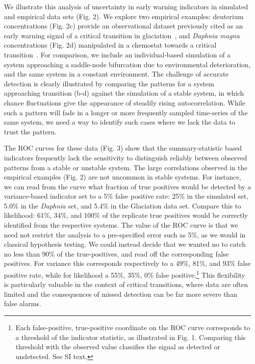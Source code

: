 \documentclass{pnastwo}
\begin{document}
\begin{article}
We illustrate this analysis of uncertainty in early warning indicators in simulated and empirical data sets (Fig. 2). 
We explore two empirical examples:
deuterium concentrations (Fig. 2c) provide an observational dataset previously cited as an early warning signal of a critical transition in glaciation~\cite{Dakos2008},
and \emph{Daphnia magna} concentrations (Fig. 2d) manipulated in a chemostat towards a critical transition~\cite{Drake2010}.  
For comparison, we include an individual-based simulation of a system approaching a saddle-node bifurcation due to environmental deterioration,
and the same system in a constant environment. 
The challenge of accurate detection is clearly illustrated by comparing the patterns for a system approaching transition (b-d) 
against the simulation of a stable system, in which chance fluctuations give the appearance of steadily rising autocorrelation. 
While such a pattern will fade in a longer or more frequently sampled time-series of the same system, 
we need a way to identify such cases where we lack the data to trust the pattern.  

The ROC curves for these data (Fig. 3) show that the summary-statistic based indicators 
frequently lack the sensitivity to distinguish reliably between observed patterns from a stable or unstable system. 
The large correlations observed in the empirical examples (Fig. 2) are not uncommon in stable systems. 
For instance, we can read from the curve what fraction of true positives would be detected by a variance-based indicator
set to a 5\% false positive rate:
25\% in the simulated set,
5.0\% in the \emph{Daphnia} set,
and 5.4\% in the Glaciation data set.
Compare this to likelihood: 61\%, 34\%, and 100\% of the replicate true positives
would be correctly identified from the respective systems.
The value of the ROC curve is that we need not restrict the analysis to a pre-specified error such as 5\%,
as we would in classical hypothesis testing.  
We could instead decide that we wanted no to catch no less than 90\% of the true-positives,
and read off the corresponding false positives.  
For variance this corresponds respectively to a 49\%, 81\%, and 93\% false positive rate,
while for likelihood a 55\%, 35\%, 0\% false positive.\footnote{
Each false-positive, true-positive coordinate on the ROC curve corresponds to a threshold of the indicator statistic,
as illustrated in Fig. 1.  
Comparing this threshold with the observed value classifies the signal as detected or undetected.  See SI text.}
This flexibility is particularly valuable in the context of critical transitions, 
where data are often limited and the consequences of missed detection can be far more severe than false alarms.  



\end{article}
\end{document}
